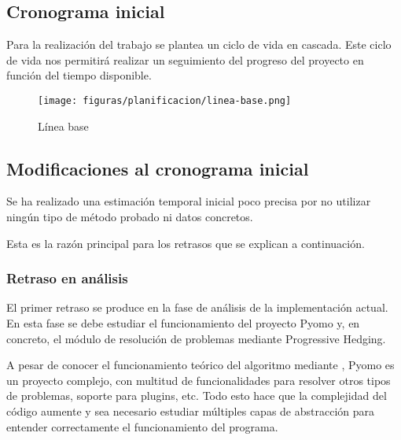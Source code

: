  

\subsection{Cronograma inicial}

Para la realización del trabajo se plantea un ciclo de vida en cascada. Este ciclo de vida nos permitirá realizar un seguimiento del progreso del proyecto en función del tiempo disponible.

\begin{figure}[H]
    \centerline{\texttt{[image: figuras/planificacion/linea-base.png]}}
    \caption{Línea base}
\end{figure}

\subsection{Modificaciones al cronograma inicial}
\label{sec:modificacionesCronograma}

Se ha realizado una estimación temporal inicial poco precisa por no utilizar ningún tipo de método probado ni datos concretos.

Esta es la razón principal para los retrasos que se explican a continuación.

\subsubsection{Retraso en análisis}

El primer retraso se produce en la fase de análisis de la implementación actual. En esta fase se debe estudiar el funcionamiento del proyecto Pyomo y, en concreto, el módulo de resolución de problemas mediante Progressive Hedging. 

A pesar de conocer el funcionamiento teórico del algoritmo mediante \cite{TODO}, Pyomo es un proyecto complejo, con multitud de funcionalidades para resolver otros tipos de problemas, soporte para plugins, etc. Todo esto hace que la complejidad del código aumente y sea necesario estudiar múltiples capas de abstracción para entender correctamente el funcionamiento del programa.

